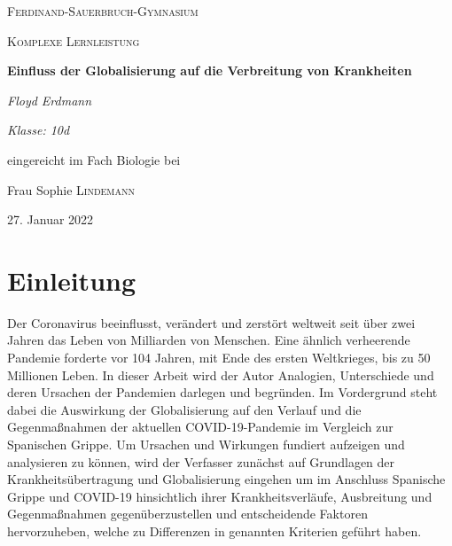 \documentclass[12pt]{article}
\begin{document}
\setlength{\baselineskip}{5mm}
\onehalfspacing

\begin{titlepage}
	\centering
	{\scshape\LARGE Ferdinand-Sauerbruch-Gymnasium \par}
	\vspace{1cm}
	{\scshape\Large Komplexe Lernleistung\par}
	\vspace{1.5cm}
	{\huge\bfseries Einfluss der Globalisierung auf die Verbreitung von Krankheiten\par}
	\vspace{2cm}
	{\Large\itshape Floyd Erdmann\par}
	{\small\itshape Klasse: 10d\par}%
	\vfill
	eingereicht im Fach Biologie bei\par
	Frau Sophie \textsc{Lindemann}

	\vfill

	{\large27. Januar 2022\par}
\end{titlepage}

\newpage
\tableofcontents
\newpage
\listoffigures
\lstlistoflistings
\newpage
{}
\setcounter{page}{5}
\section{Einleitung}
Der Coronavirus beeinflusst, verändert und zerstört weltweit seit über zwei Jahren das Leben von Milliarden von Menschen. Eine ähnlich verheerende Pandemie forderte vor 104 Jahren, mit Ende des ersten Weltkrieges, bis zu 50 Millionen Leben. In dieser Arbeit wird der Autor Analogien, Unterschiede und deren Ursachen der Pandemien darlegen und begründen. Im Vordergrund steht dabei die Auswirkung der Globalisierung auf den Verlauf und die Gegenmaßnahmen der aktuellen COVID-19-Pandemie im Vergleich zur Spanischen Grippe. Um Ursachen und Wirkungen fundiert aufzeigen und analysieren zu können, wird der Verfasser zunächst auf Grundlagen der Krankheitsübertragung und Globalisierung eingehen um im Anschluss Spanische Grippe und COVID-19 hinsichtlich ihrer Krankheitsverläufe, Ausbreitung und Gegenmaßnahmen gegenüberzustellen und entscheidende Faktoren hervorzuheben, welche zu Differenzen in genannten Kriterien geführt haben.
\end{document}
